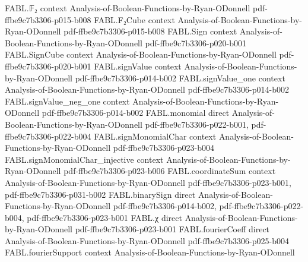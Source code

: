 \begin{theorem}
\label{FABL.majorityThreeRandomizedTree_inputCost}
\leanok
{}
\proofstep
  {FABL.𝔽₂}
  {context}
  {Analysis-of-Boolean-Functions-by-Ryan-ODonnell}
  {pdf-ffbe9c7b3306-p015-b008}
\proofstep
  {FABL.F₂Cube}
  {context}
  {Analysis-of-Boolean-Functions-by-Ryan-ODonnell}
  {pdf-ffbe9c7b3306-p015-b008}
\proofstep
  {FABL.Sign}
  {context}
  {Analysis-of-Boolean-Functions-by-Ryan-ODonnell}
  {pdf-ffbe9c7b3306-p020-b001}
\proofstep
  {FABL.SignCube}
  {context}
  {Analysis-of-Boolean-Functions-by-Ryan-ODonnell}
  {pdf-ffbe9c7b3306-p020-b001}
\proofstep
  {FABL.signValue}
  {context}
  {Analysis-of-Boolean-Functions-by-Ryan-ODonnell}
  {pdf-ffbe9c7b3306-p014-b002}
\proofstep
  {FABL.signValue_one}
  {context}
  {Analysis-of-Boolean-Functions-by-Ryan-ODonnell}
  {pdf-ffbe9c7b3306-p014-b002}
\proofstep
  {FABL.signValue_neg_one}
  {context}
  {Analysis-of-Boolean-Functions-by-Ryan-ODonnell}
  {pdf-ffbe9c7b3306-p014-b002}
\proofstep
  {FABL.monomial}
  {direct}
  {Analysis-of-Boolean-Functions-by-Ryan-ODonnell}
  {pdf-ffbe9c7b3306-p022-b001,
    pdf-ffbe9c7b3306-p022-b004}
\proofstep
  {FABL.signMonomialChar}
  {context}
  {Analysis-of-Boolean-Functions-by-Ryan-ODonnell}
  {pdf-ffbe9c7b3306-p023-b004}
\proofstep
  {FABL.signMonomialChar_injective}
  {context}
  {Analysis-of-Boolean-Functions-by-Ryan-ODonnell}
  {pdf-ffbe9c7b3306-p023-b006}
\proofstep
  {FABL.coordinateSum}
  {context}
  {Analysis-of-Boolean-Functions-by-Ryan-ODonnell}
  {pdf-ffbe9c7b3306-p023-b001,
    pdf-ffbe9c7b3306-p031-b002}
\proofstep
  {FABL.binarySign}
  {direct}
  {Analysis-of-Boolean-Functions-by-Ryan-ODonnell}
  {pdf-ffbe9c7b3306-p014-b002,
    pdf-ffbe9c7b3306-p022-b004,
    pdf-ffbe9c7b3306-p023-b001}
\proofstep
  {FABL.χ}
  {direct}
  {Analysis-of-Boolean-Functions-by-Ryan-ODonnell}
  {pdf-ffbe9c7b3306-p023-b001}
\proofstep
  {FABL.fourierCoeff}
  {direct}
  {Analysis-of-Boolean-Functions-by-Ryan-ODonnell}
  {pdf-ffbe9c7b3306-p025-b004}
\proofstep
  {FABL.fourierSupport}
  {context}
  {Analysis-of-Boolean-Functions-by-Ryan-ODonnell}

\end{theorem}
